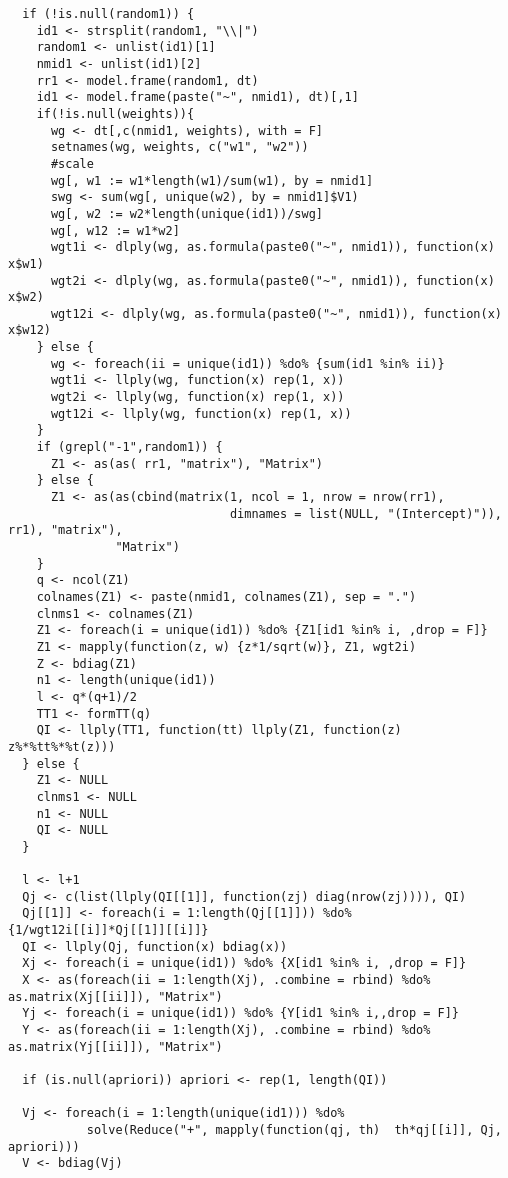 \documentclass[11pt,a4paper]{article}
\begin{document}
\begin{appendix}
\begin{small}
\begin{verbatim}
  if (!is.null(random1)) {
    id1 <- strsplit(random1, "\\|")
    random1 <- unlist(id1)[1]
    nmid1 <- unlist(id1)[2]
    rr1 <- model.frame(random1, dt)
    id1 <- model.frame(paste("~", nmid1), dt)[,1]
    if(!is.null(weights)){
      wg <- dt[,c(nmid1, weights), with = F]
      setnames(wg, weights, c("w1", "w2"))
      #scale
      wg[, w1 := w1*length(w1)/sum(w1), by = nmid1]
      swg <- sum(wg[, unique(w2), by = nmid1]$V1)
      wg[, w2 := w2*length(unique(id1))/swg]
      wg[, w12 := w1*w2]
      wgt1i <- dlply(wg, as.formula(paste0("~", nmid1)), function(x) x$w1)
      wgt2i <- dlply(wg, as.formula(paste0("~", nmid1)), function(x) x$w2)
      wgt12i <- dlply(wg, as.formula(paste0("~", nmid1)), function(x) x$w12)
    } else {
      wg <- foreach(ii = unique(id1)) %do% {sum(id1 %in% ii)}
      wgt1i <- llply(wg, function(x) rep(1, x))
      wgt2i <- llply(wg, function(x) rep(1, x))
      wgt12i <- llply(wg, function(x) rep(1, x))
    }
    if (grepl("-1",random1)) {
      Z1 <- as(as( rr1, "matrix"), "Matrix")
    } else {
      Z1 <- as(as(cbind(matrix(1, ncol = 1, nrow = nrow(rr1),
                               dimnames = list(NULL, "(Intercept)")), rr1), "matrix"),
               "Matrix")
    }
    q <- ncol(Z1)
    colnames(Z1) <- paste(nmid1, colnames(Z1), sep = ".")
    clnms1 <- colnames(Z1)
    Z1 <- foreach(i = unique(id1)) %do% {Z1[id1 %in% i, ,drop = F]}
    Z1 <- mapply(function(z, w) {z*1/sqrt(w)}, Z1, wgt2i)
    Z <- bdiag(Z1)
    n1 <- length(unique(id1))
    l <- q*(q+1)/2
    TT1 <- formTT(q)
    QI <- llply(TT1, function(tt) llply(Z1, function(z) z%*%tt%*%t(z)))
  } else {
    Z1 <- NULL
    clnms1 <- NULL
    n1 <- NULL
    QI <- NULL
  }
  
  l <- l+1
  Qj <- c(list(llply(QI[[1]], function(zj) diag(nrow(zj)))), QI)
  Qj[[1]] <- foreach(i = 1:length(Qj[[1]])) %do% {1/wgt12i[[i]]*Qj[[1]][[i]]}
  QI <- llply(Qj, function(x) bdiag(x))
  Xj <- foreach(i = unique(id1)) %do% {X[id1 %in% i, ,drop = F]}
  X <- as(foreach(ii = 1:length(Xj), .combine = rbind) %do% as.matrix(Xj[[ii]]), "Matrix")
  Yj <- foreach(i = unique(id1)) %do% {Y[id1 %in% i,,drop = F]}
  Y <- as(foreach(ii = 1:length(Xj), .combine = rbind) %do% as.matrix(Yj[[ii]]), "Matrix")
  
  if (is.null(apriori)) apriori <- rep(1, length(QI))
  
  Vj <- foreach(i = 1:length(unique(id1))) %do% 
           solve(Reduce("+", mapply(function(qj, th)  th*qj[[i]], Qj, apriori)))
  V <- bdiag(Vj)
  

\end{verbatim}
\end{small}
\end{appendix}
\end{document}
